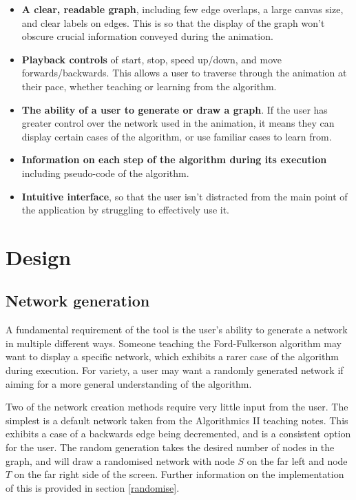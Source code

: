 \documentclass{l4proj}
\begin{document}
\begin{itemize}[noitemsep]
    \item \textbf{A clear, readable graph}, including few edge overlaps, a large canvas size, and clear labels on edges. This is so that the display of the graph won't obscure crucial information conveyed during the animation.
    \item \textbf{Playback controls} of start, stop, speed up/down, and move forwards/backwards. This allows a user to traverse through the animation at their pace, whether teaching or learning from the algorithm.
    \item \textbf{The ability of a user to generate or draw a graph}. If the user has greater control over the network used in the animation, it means they can display certain cases of the algorithm, or use familiar cases to learn from.
    \item \textbf{Information on each step of the algorithm during its execution} including pseudo-code of the algorithm.
    \item \textbf{Intuitive interface}, so that the user isn't distracted from the main point of the application by struggling to effectively use it.
\end{itemize}

\chapter{Design}

\section{Network generation}
A fundamental requirement of the tool is the user's ability to generate a network in multiple different ways. Someone teaching the Ford-Fulkerson algorithm may want to display a specific network, which exhibits a rarer case of the algorithm during execution. For variety, a user may want a randomly generated network if aiming for a more general understanding of the algorithm.

Two of the network creation methods require very little input from the user. The simplest is a default network taken from the Algorithmics II teaching notes. This exhibits a case of a backwards edge being decremented, and is a consistent option for the user. The random generation takes the desired number of nodes in the graph, and will draw a randomised network with node $S$ on the far left and node $T$ on the far right side of the screen. Further information on the implementation of this is provided in section \ref{randomise}.
\end{document}
